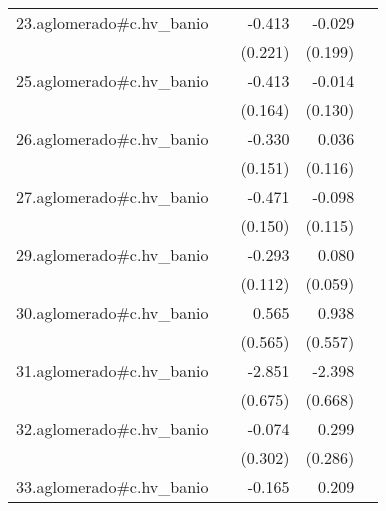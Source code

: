 {\begin{longtable}{l*{4}{D{.}{.}{-1}}}
\addlinespace
23.aglomerado#c.hv\_banio&                     &      -0.413         &      -0.029         &                     \\
            &                     &     (0.221)         &     (0.199)         &                     \\
\addlinespace
25.aglomerado#c.hv\_banio&                     &      -0.413\sym{*}  &      -0.014         &                     \\
            &                     &     (0.164)         &     (0.130)         &                     \\
\addlinespace
26.aglomerado#c.hv\_banio&                     &      -0.330\sym{*}  &       0.036         &                     \\
            &                     &     (0.151)         &     (0.116)         &                     \\
\addlinespace
27.aglomerado#c.hv\_banio&                     &      -0.471\sym{**} &      -0.098         &                     \\
            &                     &     (0.150)         &     (0.115)         &                     \\
\addlinespace
29.aglomerado#c.hv\_banio&                     &      -0.293\sym{**} &       0.080         &                     \\
            &                     &     (0.112)         &     (0.059)         &                     \\
\addlinespace
30.aglomerado#c.hv\_banio&                     &       0.565         &       0.938         &                     \\
            &                     &     (0.565)         &     (0.557)         &                     \\
\addlinespace
31.aglomerado#c.hv\_banio&                     &      -2.851\sym{***}&      -2.398\sym{***}&                     \\
            &                     &     (0.675)         &     (0.668)         &                     \\
\addlinespace
32.aglomerado#c.hv\_banio&                     &      -0.074         &       0.299         &                     \\
            &                     &     (0.302)         &     (0.286)         &                     \\
\addlinespace
33.aglomerado#c.hv\_banio&                     &      -0.165         &       0.209\sym{***}&                     \\

\end{longtable}}
